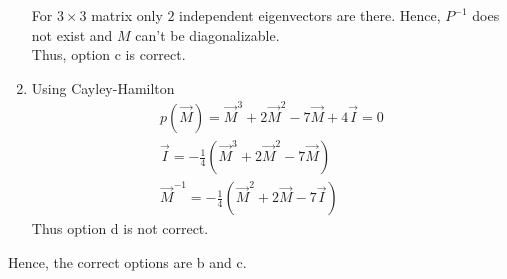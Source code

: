 \begin{enumerate}
{For $3\times3$ matrix only $2$ independent eigenvectors are there. Hence, $P^{-1}$ does not exist and $M$ can't be diagonalizable.\\
Thus, option c is correct.}\\
\item{ Using Cayley-Hamilton
\begin{align}
p(\vec{M})= \vec{M}^3+2\vec{M}^2-7\vec{M}+4\vec{I}=0\\
\vec{I}= -\frac{1}{4}(\vec{M}^3+2\vec{M}^2-7\vec{M})\\
\vec{M}^{-1}=-\frac{1}{4}(\vec{M}^2+2\vec{M}-7\vec{I})
\end{align}
Thus option d is not correct.\\}
\end{enumerate}
Hence, the correct options are b and c.
